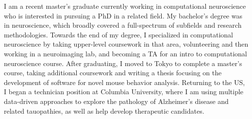 %
%
%

\vspace*{-0.1cm}

\begin{cvparagraph}
    {I am a recent master's graduate currently working in computational neuroscience who is interested in pursuing a PhD in a related field. My bachelor's degree was in neuroscience, which broadly covered a full-spectrum of subfields and research methodologies. Towards the end of my degree, I specialized in computational neuroscience by taking upper-level coursework in that area, volunteering and then working in a neuroimaging lab, and becoming a TA for an intro to computational neuroscience course. After graduating, I moved to Tokyo to complete a master's course, taking additional coursework and writing a thesis focusing on the development of software for novel mouse behavior analysis. Returning to the US, I began a technician position at Columbia University, where I am using multiple data-driven approaches to explore the pathology of Alzheimer's disease and related tauopathies, as well as help develop therapeutic candidates.}

\vspace*{-0.3cm}
\end{cvparagraph}
